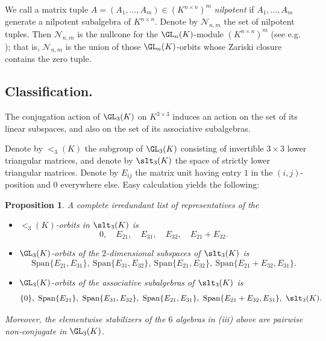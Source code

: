 \documentclass[12pt]{amsart}
\newtheorem{proposition}[theorem]{\bf Proposition}
\newcommand{\field}{K}
\begin{document}
We call a matrix tuple $A=(A_1,\dots,A_m)\in (\field^{n\times n})^m$ 
\emph{nilpotent} if $A_1,\dots,A_m$ generate a nilpotent subalgebra of $\field^{n\times n}$. 
Denote by $\mathcal{N}_{n,m}$ the set of nilpotent tuples. 
Then $\mathcal{N}_{n,m}$ is the nullcone for the $\GL_n(\field)$-module 
$(\field^{n\times n})^m$ (see e.g. \cite{lebruyn}); that is, $\mathcal{N}_{n,m}$ is the union of those 
$\GL_n(\field)$-orbits whose Zariski closure contains the zero tuple. 

\subsection{Classification.}
The conjugation action of $\GL_3(\field)$ on $\field^{3\times 3}$ induces an 
action on the set of its linear subspaces, and also on the set of its 
associative subalgebras. 

Denote by $\lt_3(\field)$ the subgroup of $\GL_3(\field)$ consisting of 
invertible $3\times 3$ lower triangular matrices, 
and denote by $\slt_3(\field)$ the space of strictly lower triangular matrices.   
Denote by $E_{ij}$ the matrix unit having entry $1$ in the $(i,j)$-position and $0$ everywhere else. 
Easy calculation yields the following: 

\begin{proposition}\label{prop:classification of subspaces}
A complete irredundant list of representatives of the 
\begin{itemize} 
\item[(i)] $\lt_3(\field)$-orbits in 
$\slt_3(\field)$ is 
\[0,\quad E_{21},\quad E_{31},\quad E_{32},\quad E_{21}+E_{32}.\]
\item[(ii)] $\GL_3(\field)$-orbits of the $2$-dimensional subspaces of 
$\slt_3(\field)$ is  
\[\mathrm{Span}\{E_{21},E_{31}\},\ 
\mathrm{Span}\{E_{31},E_{32}\},\ 
\mathrm{Span}\{E_{21},E_{32}\},\ 
\mathrm{Span}\{E_{21}+E_{32},E_{31}\}.\]
\item[(iii)] $\GL_3(\field)$-orbits of the associative subalgebras of 
$\slt_3(\field)$ is 
\[\{0\},\ \mathrm{Span}\{E_{21}\},\ \mathrm{Span}\{E_{31},E_{32}\},\ 
\mathrm{Span}\{E_{21},E_{31}\},\ \mathrm{Span}\{E_{21}+E_{32},E_{31}\},\ 
\slt_3(\field).\]
\end{itemize} 
Moreover, the elementwise stabilizers of the $6$ algebras in (iii) above are pairwise non-conjugate 
in $\GL_3(\field)$. 
\end{proposition}
\end{document}
